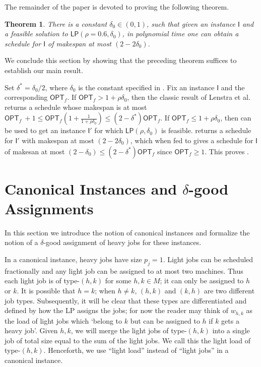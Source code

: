 \documentclass[11pt]{article}
\newenvironment{proofof}[1]{\rm \trivlist \item[\hskip \labelsep{\it #1.\/}]}{\outerparskip 0pt\endtrivlist}
\newtheorem{theorem}{Theorem} \newtheorem{lemma}{Lemma}[section]
\newenvironment{proofof}[1]{\begin{proof}[#1]}{\end{proof}}
\newcommand{\cI}{{\mathsf I}}
\newcommand{\OPT}{{\mathsf{OPT}}}
\newcommand{\LP}{{\mathsf{LP}}}
\begin{document}
The remainder of the paper is devoted to proving the following theorem.

\begin{theorem} 
\label{thm:main-2}
There is a constant $\delta_0 \in(0,1)$, such that given an instance $\cI$ and a feasible solution to $\LP(\rho\!=\!0.6,\delta_0)$, in polynomial time one can obtain a schedule for $\cI$ of makespan at most $(2\!-\!2\delta_0)$.
\end{theorem}

We conclude this section by showing that the preceding theorem suffices to establish our main result.

\begin{proofof}{\bf Proof of Theorem \ref{thm:main}}
Set $\delta^* = \delta_0/2$, where $\delta_0$ is the constant specified in .
Fix an instance $\cI$ and the corresponding $\OPT_f$.
If $\OPT_f > 1 + \rho\delta_0$, then the classic result of Lenstra et al.~\cite{LST90} returns a schedule whose makespan is at most $\OPT_f ~+ 1 \leq \OPT_f\left(1+ \frac{1}{1+\rho\delta_0}\right) \leq \left(2-\delta^*\right)\OPT_f$.
If $\OPT_f \leq 1+ \rho\delta_0$, then  can be used to get an instance $\cI'$ for which $\LP(\rho,\delta_0)$ is feasible.
 returns a schedule for $\cI'$ with makespan at most $(2 -2\delta_0)$, which when fed to  gives
a schedule for $\cI$ of makesan at most $(2 - \delta_0) \leq (2-\delta^*)\OPT_f$ since $\OPT_f\geq 1$.
This proves .
\end{proofof}

\section{Canonical Instances and \texorpdfstring{$\delta$}{delta}-good Assignments}
\label{sec:canonical_definition}

In this section we introduce the notion of canonical instances and formalize the notion of a $\delta$-good assignment of heavy jobs for these instances.  



In a canonical instance, heavy jobs have size $p_j = 1$. Light jobs can be scheduled fractionally and any light job can be assigned to at most two machines. Thus each light job is of type-$(h, k)$ for some $h, k \in M$; it can only be assigned to $h$ or $k$. It is possible that $h \!=\! k$; when $h \!\neq\! k$, $(h, k)$ and $(k, h)$ are two different job types. Subsequently, it will be clear that these types are differentiated and defined by how the LP assigns the jobs; for now the reader may think of $w_{h,k}$ as the load of light jobs which `belong to $k$ but can be assigned to $h$ if $k$ gets a heavy job'.
  Given $h, k$, we will merge the light jobs of type-$(h, k)$ into a single job of total size equal to the sum of the light jobs. We call this the light load of type-$(h, k)$.
Henceforth, we use ``light load'' instead of ``light jobs'' in a canonical instance. 
\end{document}
